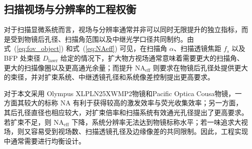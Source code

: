 



\subsection{扫描视场与分辨率的工程权衡}\label{2.4.4}

对于扫描显微系统而言，视场与分辨率通常并非可以同时无限提升的独立指标，而是受到物镜后孔径、扫描角范围以及中继光学口径共同制约。由式~(\ref{eq:fov_object}) 和式~(\ref{eq:NAeff}) 可见，在扫描角 $\alpha$、扫描透镜焦距 $f_s$ 以及 BFP 处束径 $D_{\mathrm{laser}}$ 给定的情况下，扩大物方视场通常意味着需要更大的扫描角、更大的扫描像圈以及更高通光余量；而提升 $\mathrm{NA}_{\mathrm{eff}}$ 则要求在物镜后孔径处提供更大的束径，并对扩束系统、中继透镜孔径和系统像差控制提出更高要求。

对于本文采用 Olympus XLPLN25XWMP2物镜和Pacific Optica Cousa物镜，一方面其较大的标称 NA 有利于获得较高的激发效率与荧光收集效率；另一方面，其后孔径直径也相应较大，对扩束倍率和扫描系统有效通光孔径提出了更高要求。若扩束不足，则 $\mathrm{NA}_{\mathrm{eff}}$ 下降，系统分辨率无法达到物镜标称水平；若一味追求大视场，则又容易受到视场数、扫描透镜孔径及边缘像差的共同限制。因此，工程实现中通常需要进行均衡设计。

